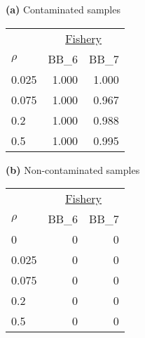 {\bf (a)} Contaminated samples 
\begin{center}
\begin{tabular}{lrr} 
  &  \multicolumn{2}{c}{\underline{Fishery}} \\
$\rho~~~~~~~$  &  BB_6            &  BB_7            \\  
\hline 0.025   &  1.000           &  1.000           \\  
0.075           &  1.000           &  0.967           \\  
0.2             &  1.000           &  0.988           \\  
0.5             &  1.000           &  0.995           \\  
\end{tabular} 
\end{center}
{\bf (b)} Non-contaminated samples 
\begin{center}
\begin{tabular}{lrr} 
  &  \multicolumn{2}{c}{\underline{Fishery}} \\
$\rho~~~~~~~$  &  BB_6            &  BB_7            \\  
\hline 0       &  0               &  0               \\  
0.025           &  0               &  0               \\  
0.075           &  0               &  0               \\  
0.2             &  0               &  0               \\  
0.5             &  0               &  0               \\  
\end{tabular} 
\end{center}
